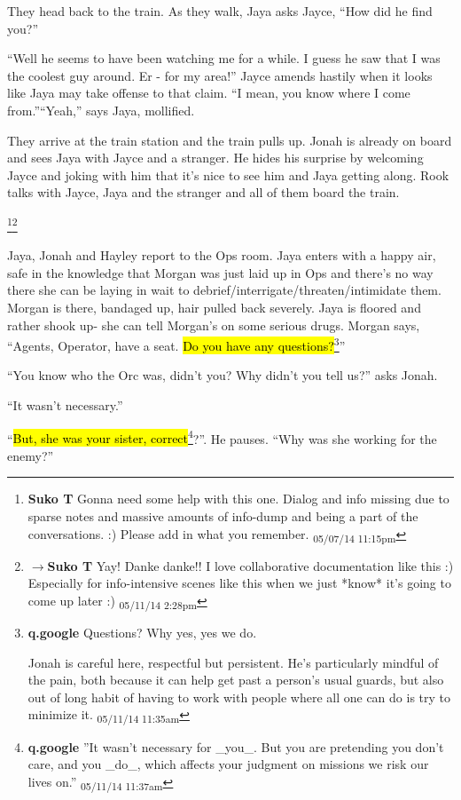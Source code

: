 They head back to the train.  As they walk, Jaya asks Jayce, ``How did he find you?''

``Well he seems to have been watching me for a while.  I guess he saw that I was the coolest guy around.  Er - for my area!'' Jayce amends hastily when it looks like Jaya may take offense to that claim.  ``I mean, you know where I come from.''``Yeah,'' says Jaya, mollified.



They arrive at the train station and the train pulls up.  Jonah is already on board and sees Jaya with Jayce and a stranger.  He hides his surprise by welcoming Jayce and joking with him that it's nice to see him and Jaya getting along.  Rook talks with Jayce, Jaya and the stranger and all of them board the train.


\footnote{\textbf{Suko T }Gonna need some help with this one.  Dialog and info missing due to sparse notes and massive amounts of info-dump and being a part of the conversations. :)  Please add in what you remember. \textsubscript{05/07/14 11:15pm}}\footnote{$\rightarrow$\textbf{Suko T }Yay!  Danke danke!!  I love collaborative documentation like this :)  Especially for info-intensive scenes like this when we just *know* it's going to come up later :) \textsubscript{05/11/14 2:28pm}}

Jaya, Jonah and Hayley report to the Ops room.  Jaya enters with a happy air, safe in the knowledge that Morgan was just laid up in Ops and there's no way there she can be laying in wait to debrief/interrigate/threaten/intimidate them.  Morgan is there, bandaged up, hair pulled back severely.  Jaya is floored and rather shook up- she can tell Morgan's on some serious drugs.  Morgan says, ``Agents, Operator, have a seat.  \hl{Do you have any questions?}\footnote{\textbf{q.google }Questions?  Why yes, yes we do.

Jonah is careful here, respectful but persistent.  He's particularly mindful of the pain, both because it can help get past a person's usual guards, but also out of long habit of having to work with people where all one can do is try to minimize it. \textsubscript{05/11/14 11:35am}}''

``You know who the Orc was, didn't you?  Why didn't you tell us?'' asks Jonah.

``It wasn't necessary.''

``\hl{But, she was your sister, correct}\footnote{\textbf{q.google }''It wasn't necessary for \_you\_.  But you are pretending you don't care, and you \_do\_, which affects your judgment on missions we risk our lives on.'' \textsubscript{05/11/14 11:37am}}?''.  He pauses. ``Why was she working for the enemy?''

